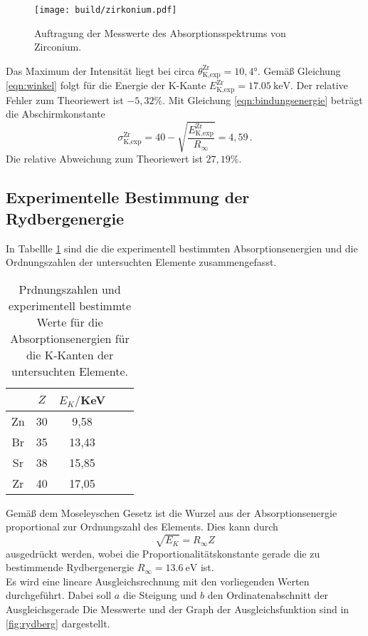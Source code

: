 \begin{figure}
  \centering
  \texttt{[image: build/zirkonium.pdf]}
  \caption{Auftragung der Messwerte des Absorptionsspektrums von Zirconium.}
  \label{fig:zirconium}
\end{figure}

Das Maximum der Intensität liegt bei circa $\theta_{\text{K,exp}}^{\text{Zr}} = 10{,}4°$.
Gemäß Gleichung \eqref{eqn:winkel} folgt für die Energie der K-Kante $E_{\text{K,exp}}^{\text{Zr}} = \SI{17.05}{\kilo\electronvolt}$.
Der relative Fehler zum Theoriewert ist $-5{,}32\%$. Mit Gleichung \eqref{eqn:bindungsenergie}
beträgt die Abschirmkonstante
\begin{equation*}
  \sigma_{\text{K,exp}}^{\text{Zr}} =  40 - \sqrt{\frac{E_{\text{K,exp}}^{\text{Zr}}}{R_\infty}} = 4{,}59\,.
\end{equation*}
Die relative Abweichung zum Theoriewert ist $27{,}19\%$.

\subsection{Experimentelle Bestimmung der Rydbergenergie}

In Tabellle \ref{tab:zusammenfassung} sind die die experimentell bestimmten Absorptionsenergien
und die Ordnungszahlen der untersuchten Elemente zusammengefasst.

\begin{table}
	\begin{center}
    \caption{Prdnungszahlen und experimentell bestimmte Werte für die Absorptionsenergien
    für die K-Kanten der untersuchten Elemente.}
    \label{tab:zusammenfassung}
		\begin{tabular}{ccccc}
		\toprule
			& {$Z$} & {$E_K/$KeV} \\
			\midrule
			Zn &  30  & 9,58  \\
      Br &  35  & 13,43 \\
      Sr &  38  & 15,85 \\
      Zr &  40  & 17,05 \\
		\bottomrule
		\end{tabular}
	\end{center}
\end{table}

Gemäß dem Moseleyschen Gesetz ist die Wurzel aus der Absorptionsenergie proportional
zur Ordnungszahl des Elements. Dies kann durch
\begin{equation*}
  \sqrt{E_K} = R_\infty Z
\end{equation*}
ausgedrückt werden, wobei die Proportionalitätskonstante gerade die zu bestimmende
Rydbergenergie $R_\infty = \SI{13.6}{\electronvolt}$ ist.\\
Es wird eine lineare Ausgleichsrechnung mit den vorliegenden Werten durchgeführt.
Dabei soll $a$ die Steigung und $b$ den Ordinatenabschnitt der Ausgleichsgerade  Die Messwerte
und der Graph der Ausgleichsfunktion sind in \ref{fig:rydberg} dargestellt.

